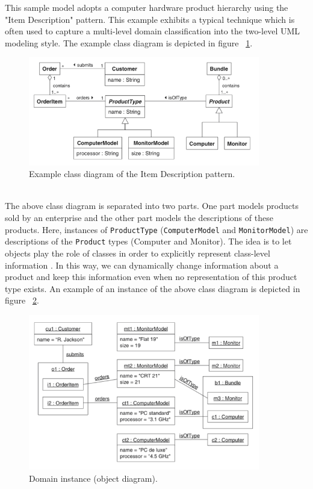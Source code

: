 This sample model adopts a computer hardware product hierarchy using the "Item Description" pattern. This example exhibits a typical technique which is often used to capture a multi-level domain classification into the two-level UML modeling style. The example class diagram is depicted in figure ~\ref{fig:cd_itemdesc}.
\begin{figure}[h!]
\centering
\includegraphics[width=0.9\textwidth]{images/chap2_cd_itemdesc.png}
\caption{Example class diagram of the Item Description pattern.}
\label{fig:cd_itemdesc}
\end{figure} \\
The above class diagram is separated into two parts. One part models products sold by an enterprise and the other part models the descriptions of these products. Here, instances of \texttt{ProductType} (\texttt{ComputerModel} and \texttt{MonitorModel}) are descriptions of the \texttt{Product} types (Computer and Monitor). The idea is to let objects play the role of classes in order to explicitly represent class-level information \cite{AccidentalComplexity}. In this way, we can dynamically change information about a product and keep this information even when no representation of this product type exists. An example of an instance of the above class diagram is depicted in figure ~\ref{fig:domain_instance}.
\begin{figure}[h!]
\centering
\includegraphics[width=0.9\textwidth]{images/chap2_domain_instance.png}
\caption{Domain instance (object diagram).}
\label{fig:domain_instance}
\end{figure} \\
